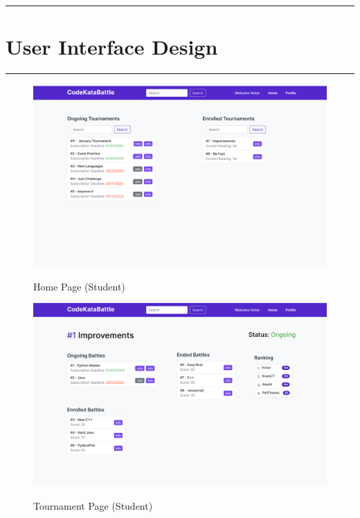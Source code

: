 \documentclass{Configuration_Files/Template}
\begin{document}
{\color{bluepoli}\rule{\linewidth}{0.1pt}}

\chapter{User Interface Design}

{\color{bluepoli}\rule{\linewidth}{0.1pt}}

\begin{figure}[H]
\centering
\includegraphics[scale = 0.25]{Images/UI/MainPage_Student.png}\\
\caption{Home Page (Student)}
\end{figure}

\begin{figure}[H]
\centering
\includegraphics[scale = 0.25]{Images/UI/TournamentPage_Student.png}\\
\caption{Tournament Page (Student)}
\end{figure}
\end{document}
